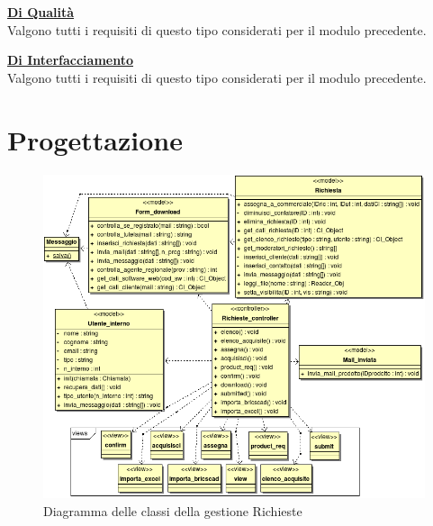 \underline{\textbf{Di Qualit\`a}}\\
\indent Valgono tutti i requisiti di questo tipo considerati per il modulo precedente.

\underline{\textbf{Di Interfacciamento}}\\
\indent Valgono tutti i requisiti di questo tipo considerati per il modulo precedente.


\newpage
\section{Progettazione}
\begin{figure}[!ht]
\centering
  \includegraphics[scale=0.8]{./images/richiesteMVC.png}
\caption{Diagramma delle classi della gestione Richieste}
\label{richieste}
\end{figure}

